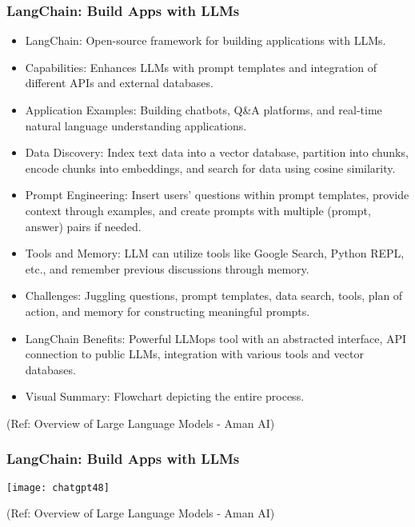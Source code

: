\begin{frame}[fragile]\frametitle{LangChain: Build Apps with LLMs}

\begin{itemize}
\item LangChain: Open-source framework for building applications with LLMs.
\item Capabilities: Enhances LLMs with prompt templates and integration of different APIs and external databases.
\item Application Examples: Building chatbots, Q&A platforms, and real-time natural language understanding applications.
\item Data Discovery: Index text data into a vector database, partition into chunks, encode chunks into embeddings, and search for data using cosine similarity.
\item Prompt Engineering: Insert users' questions within prompt templates, provide context through examples, and create prompts with multiple (prompt, answer) pairs if needed.
\item Tools and Memory: LLM can utilize tools like Google Search, Python REPL, etc., and remember previous discussions through memory.
\item Challenges: Juggling questions, prompt templates, data search, tools, plan of action, and memory for constructing meaningful prompts.
\item LangChain Benefits: Powerful LLMops tool with an abstracted interface, API connection to public LLMs, integration with various tools and vector databases.
\item Visual Summary: Flowchart depicting the entire process.
\end{itemize}

{\tiny (Ref: Overview of Large Language Models - Aman AI)}

\end{frame}

\begin{frame}[fragile]\frametitle{LangChain: Build Apps with LLMs}

		\begin{center}
		\texttt{[image: chatgpt48]}
		\end{center}
		
{\tiny (Ref: Overview of Large Language Models - Aman AI)}

\end{frame}

